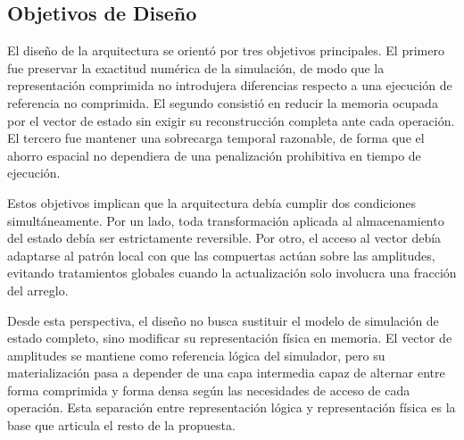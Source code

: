 \subsection{Objetivos de Diseño}

El diseño de la arquitectura se orientó por tres objetivos principales. El primero fue preservar la exactitud numérica de la simulación, de modo
que la representación comprimida no introdujera diferencias respecto a una ejecución de referencia no comprimida. El segundo consistió en reducir
la memoria ocupada por el vector de estado sin exigir su reconstrucción completa ante cada operación. El tercero fue mantener una sobrecarga
temporal razonable, de forma que el ahorro espacial no dependiera de una penalización prohibitiva en tiempo de ejecución.

Estos objetivos implican que la arquitectura debía cumplir dos condiciones simultáneamente. Por un lado, toda transformación aplicada al
almacenamiento del estado debía ser estrictamente reversible. Por otro, el acceso al vector debía adaptarse al patrón local con que las compuertas
actúan sobre las amplitudes, evitando tratamientos globales cuando la actualización solo involucra una fracción del arreglo.

Desde esta perspectiva, el diseño no busca sustituir el modelo de simulación de estado completo, sino modificar su representación física en
memoria. El vector de amplitudes se mantiene como referencia lógica del simulador, pero su materialización pasa a depender de una capa intermedia
capaz de alternar entre forma comprimida y forma densa según las necesidades de acceso de cada operación. Esta separación entre representación
lógica y representación física es la base que articula el resto de la propuesta.
